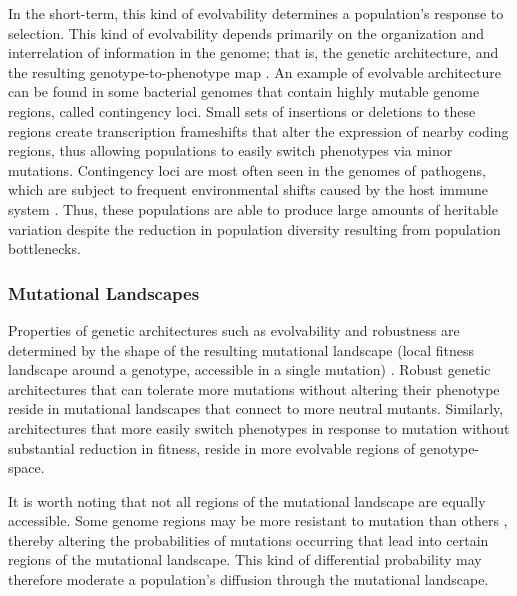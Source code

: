 \documentclass[PhD]{msu-thesis}
\begin{document}
In the short-term, this kind of evolvability determines a population's response to selection. This kind of evolvability depends primarily on the organization and interrelation of information in the genome; that is, the genetic architecture, and the resulting genotype-to-phenotype map \cite{gunter_p._wagner_perspective:_1996}. An example of evolvable architecture can be found in some bacterial genomes that contain highly mutable genome regions, called contingency loci. Small sets of insertions or deletions to these regions create transcription frameshifts that alter the expression of nearby coding regions, thus allowing populations to easily switch phenotypes via minor mutations. Contingency loci are most often seen in the genomes of pathogens, which are subject to frequent environmental shifts caused by the host immune system \cite{bayliss_simple_2001}. Thus, these populations are able to produce large amounts of heritable variation despite the reduction in population diversity resulting from population bottlenecks.


\subsubsection{Mutational Landscapes}
Properties of genetic architectures such as evolvability and robustness are determined by the shape of the resulting mutational landscape (local fitness landscape around a genotype, accessible in a single mutation) \cite{andreas_wagner_robustness_2008}. Robust genetic architectures that can tolerate more mutations without altering their phenotype reside in mutational landscapes that connect to more neutral mutants. Similarly, architectures that more easily switch phenotypes in response to mutation without substantial reduction in fitness, reside in more evolvable regions of genotype-space.

It is worth noting that not all regions of the mutational landscape are equally accessible. Some genome regions may be more resistant to mutation than others \cite{lee_rate_2012}, thereby altering  the probabilities of mutations occurring that lead into certain regions of the mutational landscape. This kind of differential probability may therefore moderate a population's diffusion through the mutational landscape.
\end{document}
